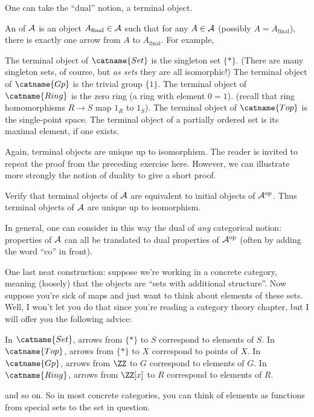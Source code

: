 One can take the ``dual'' notion, a terminal object.
\begin{example}
	An  of $\AA$ is an object
	$A_{\text{final}} \in \AA$ such that for any $A \in \AA$ (possibly $A = A_{\text{final}}$),
	there is exactly one arrow from $A$ to $A_{\text{final}}$.
	For example,
	\begin{enumerate}[(a)]
		\ii The terminal object of $\catname{Set}$ is the singleton set $\{\ast\}$.
		(There are many singleton sets, of course, but \emph{as sets} they are all isomorphic!)
		\ii The terminal object of $\catname{Gp}$ is the trivial group $\{1\}$.
		\ii The terminal object of $\catname{Ring}$ is the zero ring (a ring with element $0=1$).
		(recall that ring homomorphisms $R \to S$ map $1_R$ to $1_S$).
		\ii The terminal object of $\catname{Top}$ is the single-point space.
		\ii The terminal object of a partially ordered set is its maximal element, if one exists.
	\end{enumerate}
\end{example}

Again, terminal objects are unique up to isomorphism.
The reader is invited to repeat the proof from the preceding exercise here.
However, we can illustrate more strongly the notion of duality to give a short proof.
\begin{ques}
	Verify that terminal objects of $\AA$ are equivalent to initial objects of $\AA^{\text{op}}$.
	Thus terminal objects of $\AA$ are unique up to isomorphism.
\end{ques}
In general, one can consider in this way the dual of \emph{any} categorical notion:
properties of $\AA$ can all be translated to dual properties of $\AA^{\text{op}}$
(often by adding the word ``co'' in front).

One last neat construction: suppose we're working in a concrete category,
meaning (loosely) that the objects are ``sets with additional structure''.
Now suppose you're sick of maps and just want to think about elements of these sets.
Well, I won't let you do that since you're reading a category theory chapter,
but I will offer you the following advice:
\begin{itemize}
	\ii In $\catname{Set}$, arrows from $\{\ast\}$ to $S$ correspond to elements of $S$.
	\ii In $\catname{Top}$, arrows from $\{\ast\}$ to $X$ correspond to points of $X$.
	\ii In $\catname{Gp}$, arrows from $\ZZ$ to $G$ correspond to elements of $G$.
	\ii In $\catname{Ring}$, arrows from $\ZZ[x]$ to $R$ correspond to elements of $R$.
\end{itemize}
and so on.
So in most concrete categories, you can think of elements as functions from special sets to the set in question.



